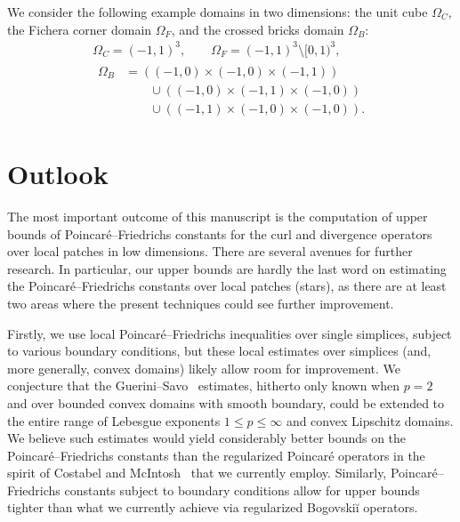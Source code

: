 \documentclass[10pt,a4paper]{article}
\begin{document}
We consider the following example domains in two dimensions:
the unit cube $\Omega_C$, the Fichera corner domain $\Omega_F$, and the crossed bricks domain $\Omega_{B}$:
\begin{gather*}
    \Omega_{C}  = (-1,1)^3,
    \qquad 
    \Omega_{F}  = (-1,1)^3 \setminus [0,1)^3,
    \\
    \begin{aligned}
    \Omega_{B} &= 
    \left( (-1,0) \times (-1,0) \times (-1,1) \right)
    \\&\qquad
    \cup 
    \left( (-1,0) \times (-1,1) \times (-1,0) \right)
    \\&\qquad
    \cup 
    \left( (-1,1) \times (-1,0) \times (-1,0) \right)
    .
    \end{aligned}
\end{gather*}





\section{Outlook}\label{section:outlook}

The most important outcome of this manuscript is the computation of upper bounds of Poincar\'e--Friedrichs constants for the curl and divergence operators over local patches in low dimensions. 
There are several avenues for further research. 
In particular, our upper bounds are hardly the last word on estimating the Poincar\'e--Friedrichs constants over local patches (stars), 
as there are at least two areas where the present techniques could see further improvement. 


Firstly, we use local Poincar\'e--Friedrichs inequalities over single simplices, subject to various boundary conditions, but these local estimates over simplices (and, more generally, convex domains) likely allow room for improvement. We conjecture that the Guerini--Savo~\cite{guerini2004eigenvalue} estimates, hitherto only known when $p=2$ and over bounded convex domains with smooth boundary, could be extended to the entire range of Lebesgue exponents $1 \leq p \leq \infty$ and convex Lipschitz domains. 
We believe such estimates would yield considerably better bounds on the Poincar\'e--Friedrichs constants than the regularized Poincar\'e operators in the spirit of Costabel and McIntosh~\cite{costabel2010bogovskiui} that we currently employ. Similarly, Poincar\'e--Friedrichs constants subject to boundary conditions allow for upper bounds tighter than what we currently achieve via regularized Bogovski\u{i} operators. 
\end{document}
